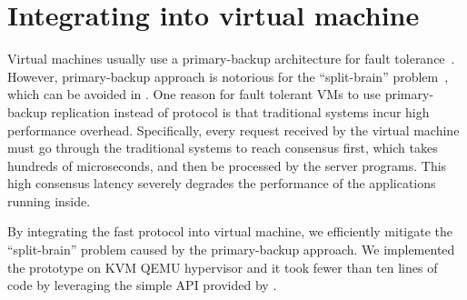 \section{Integrating \xxx into virtual machine} \label{sec:vm-integration}
Virtual machines usually use a primary-backup architecture for fault 
tolerance~\cite{alsberg1976principle}. However, primary-backup approach is 
notorious for the ``split-brain'' problem~\cite{scales2010design}, which can be 
avoided in \paxos. One reason for fault tolerant VMs to use 
primary-backup replication instead of \paxos protocol is that traditional 
\paxos 
systems incur high performance overhead. Specifically, every 
request received by the virtual machine must go through the traditional \paxos 
systems to reach consensus first, which takes hundreds of microseconds, and 
then 
be processed by the server programs. This high consensus latency severely 
degrades the performance of the applications running inside.

By integrating the fast \xxx \paxos protocol into virtual machine, we 
efficiently mitigate the ``split-brain'' problem caused by the primary-backup 
approach. We implemented the prototype on KVM QEMU hypervisor and it took fewer 
than ten lines of code by leveraging the simple API provided by \xxx.